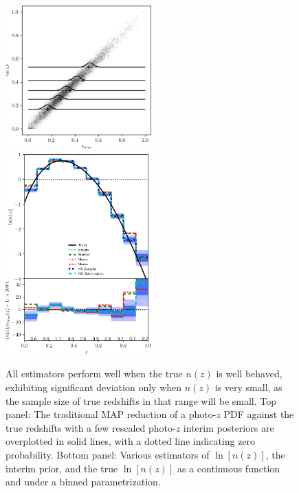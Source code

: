 \documentclass[iop]{emulateapj}
\begin{document}
\begin{figure}
	\begin{center}
		
\includegraphics[width=0.5\textwidth]{fig/smooth_truth/scatter.png}\\
		
\includegraphics[width=0.5\textwidth]{fig/smooth_truth/estimators.png}	
		\caption{All estimators perform well when the true $n(z)$ is 
well behaved, exhibiting significant deviation only when $n(z)$ is very small, 
as the sample size of true redshifts in that range will be small.  Top panel: 
The traditional MAP reduction of a photo-$z$ PDF against the true redshifts 
with a few rescaled photo-$z$ interim posteriors are overplotted in solid 
lines, with a dotted line indicating zero probability.  Bottom panel: Various 
estimators of $\ln[n(z)]$, the interim prior, and the true $\ln[n(z)]$ as a 
continuous function and under a binned parametrization.}
		\label{fig:featured}
	\end{center}
\end{figure}
\end{document}
